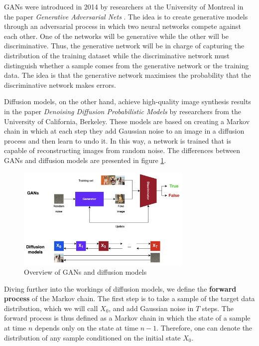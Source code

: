 GANs were introduced in 2014 by researchers at the University of Montreal in the paper \textit{Generative Adversarial Nets} \cite{goodfellow2020generative}. The idea is to create generative models through an adversarial process in which two neural networks compete against each other.  One of the networks will be generative while the other will be discriminative. Thus, the generative network will be in charge of capturing the distribution of the training dataset while the discriminative network must distinguish whether a sample comes from the generative network or the training data. The idea is that the generative network maximises the probability that the discriminative network makes errors. 

Diffusion models, on the other hand, achieve high-quality image synthesis results in the paper \textit{Denoising Diffusion Probabilistic Models} \cite{ho2020denoising} by researchers from the University of California, Berkeley. These models are based on creating a Markov chain in which at each step they add Gaussian noise to an image in a diffusion process and then learn to undo it. In this way, a network is trained that is capable of reconstructing images from random noise. The differences between GANs and diffusion models are presented in figure \ref{fig:GansvsDM}.

\begin{figure}
    \centering
    \includegraphics[width=0.75\textwidth]{Pictures/GansvsDM} 
    \caption{Overview of GANs and diffusion models}
    \label{fig:GansvsDM}
\end{figure}

Diving further into the workings of diffusion models, we define the \textbf{forward process} of the Markov chain. The first step is to take a sample of the target data distribution, which we will call $X_0$, and add Gaussian noise in $T$ steps. The forward process is thus defined as a Markov chain in which the state of a sample at time $n$ depends only on the state at time $n-1$. Therefore, one can denote the distribution of any sample conditioned on the initial state $X_0$.

